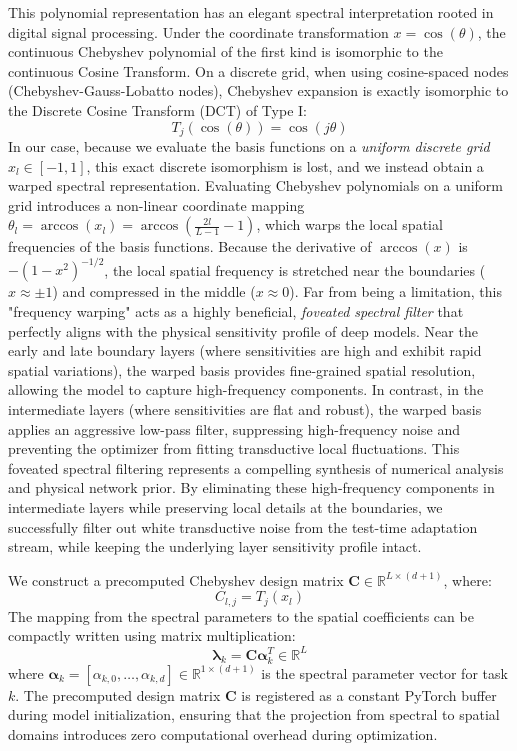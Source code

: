 This polynomial representation has an elegant spectral interpretation rooted in digital signal processing. Under the coordinate transformation $x = \cos(\theta)$, the continuous Chebyshev polynomial of the first kind is isomorphic to the continuous Cosine Transform. On a discrete grid, when using cosine-spaced nodes (Chebyshev-Gauss-Lobatto nodes), Chebyshev expansion is exactly isomorphic to the Discrete Cosine Transform (DCT) of Type I:
\begin{equation}
T_j(\cos(\theta)) = \cos(j \theta)
\end{equation}
In our case, because we evaluate the basis functions on a \emph{uniform discrete grid} $x_l \in [-1, 1]$, this exact discrete isomorphism is lost, and we instead obtain a warped spectral representation. Evaluating Chebyshev polynomials on a uniform grid introduces a non-linear coordinate mapping $\theta_l = \arccos(x_l) = \arccos\left(\frac{2l}{L-1} - 1\right)$, which warps the local spatial frequencies of the basis functions. Because the derivative of $\arccos(x)$ is $- (1 - x^2)^{-1/2}$, the local spatial frequency is stretched near the boundaries ($x \approx \pm 1$) and compressed in the middle ($x \approx 0$). Far from being a limitation, this "frequency warping" acts as a highly beneficial, \emph{foveated spectral filter} that perfectly aligns with the physical sensitivity profile of deep models. Near the early and late boundary layers (where sensitivities are high and exhibit rapid spatial variations), the warped basis provides fine-grained spatial resolution, allowing the model to capture high-frequency components. In contrast, in the intermediate layers (where sensitivities are flat and robust), the warped basis applies an aggressive low-pass filter, suppressing high-frequency noise and preventing the optimizer from fitting transductive local fluctuations. This foveated spectral filtering represents a compelling synthesis of numerical analysis and physical network prior. By eliminating these high-frequency components in intermediate layers while preserving local details at the boundaries, we successfully filter out white transductive noise from the test-time adaptation stream, while keeping the underlying layer sensitivity profile intact.

We construct a precomputed Chebyshev design matrix $\mathbf{C} \in \mathbb{R}^{L \times (d+1)}$, where:
\begin{equation}
C_{l, j} = T_j(x_l)
\end{equation}
The mapping from the spectral parameters to the spatial coefficients can be compactly written using matrix multiplication:
\begin{equation}
\boldsymbol{\lambda}_k = \mathbf{C} \boldsymbol{\alpha}_k^T \in \mathbb{R}^L
\end{equation}
where $\boldsymbol{\alpha}_k = [\alpha_{k, 0}, \dots, \alpha_{k, d}] \in \mathbb{R}^{1 \times (d+1)}$ is the spectral parameter vector for task $k$. The precomputed design matrix $\mathbf{C}$ is registered as a constant PyTorch buffer during model initialization, ensuring that the projection from spectral to spatial domains introduces zero computational overhead during optimization.

